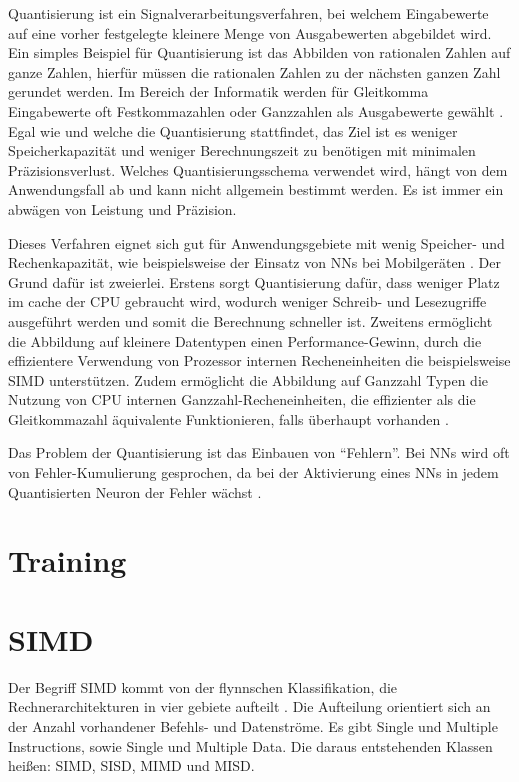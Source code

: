 Quantisierung ist ein Signalverarbeitungsverfahren, bei welchem Eingabewerte auf eine vorher festgelegte kleinere Menge von Ausgabewerten abgebildet wird. Ein simples Beispiel für Quantisierung ist das Abbilden von rationalen Zahlen auf ganze Zahlen, hierfür müssen die rationalen Zahlen zu der nächsten ganzen Zahl gerundet werden. Im Bereich der Informatik werden für Gleitkomma Eingabewerte oft Festkommazahlen oder Ganzzahlen als Ausgabewerte gewählt \cite{Gysel2016}. Egal wie und welche die Quantisierung stattfindet, das Ziel ist es weniger Speicherkapazität und weniger Berechnungszeit zu benötigen mit minimalen Präzisionsverlust. Welches Quantisierungsschema verwendet wird, hängt von dem Anwendungsfall ab und kann nicht allgemein bestimmt werden. Es ist immer ein abwägen von Leistung und Präzision.

Dieses Verfahren eignet sich gut für Anwendungsgebiete mit wenig Speicher- und Rechenkapazität, wie beispielsweise der Einsatz von \acp{NN} bei Mobilgeräten \cite{MaQuantization2019, Gysel2016}. Der Grund dafür ist zweierlei. Erstens sorgt Quantisierung dafür, dass weniger Platz im cache der CPU gebraucht wird, wodurch weniger Schreib- und Lesezugriffe ausgeführt werden und somit die Berechnung schneller ist. Zweitens ermöglicht die Abbildung auf kleinere Datentypen einen Performance-Gewinn, durch die effizientere Verwendung von Prozessor internen Recheneinheiten die beispielsweise \ac{SIMD} unterstützen. Zudem ermöglicht die Abbildung auf Ganzzahl Typen die Nutzung von CPU internen Ganzzahl-Recheneinheiten, die effizienter als die Gleitkommazahl äquivalente Funktionieren, falls überhaupt vorhanden \cite{Jacob2017}.

Das Problem der Quantisierung ist das Einbauen von \enquote{Fehlern}. Bei \acp{NN} wird oft von Fehler-Kumulierung gesprochen, da bei der Aktivierung eines \acp{NN} in jedem Quantisierten Neuron der Fehler wächst \cite{Park2018}.

\section{Training}

\section{SIMD}

Der Begriff \ac{SIMD} kommt von der flynnschen Klassifikation, die Rechnerarchitekturen in vier gebiete aufteilt \cite{Flynn1972}. Die Aufteilung orientiert sich an der Anzahl vorhandener Befehls- und Datenströme. Es gibt Single und Multiple Instructions, sowie Single und Multiple Data. Die daraus entstehenden Klassen heißen: \acs{SIMD}, \acs{SISD}, \acs{MIMD} und {MISD}.

